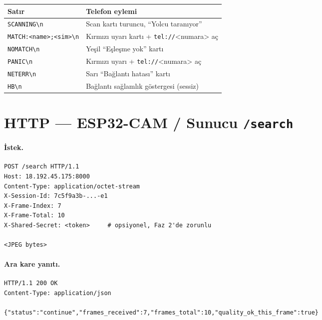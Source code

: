 \begin{tabular}{l l}
\toprule
\textbf{Satır}                                   & \textbf{Telefon eylemi}\\
\midrule
\texttt{SCANNING\textbackslash n}                & Scan kartı turuncu, ``Yolcu taranıyor''\\
\texttt{MATCH:<name>;<sim>\textbackslash n}      & Kırmızı uyarı kartı + \texttt{tel://}<numara> aç\\
\texttt{NOMATCH\textbackslash n}                 & Yeşil ``Eşleşme yok'' kartı\\
\texttt{PANIC\textbackslash n}                   & Kırmızı uyarı + \texttt{tel://}<numara> aç\\
\texttt{NETERR\textbackslash n}                  & Sarı ``Bağlantı hatası'' kartı\\
\texttt{HB\textbackslash n}                      & Bağlantı sağlamlık göstergesi (sessiz)\\
\bottomrule
\end{tabular}

\section{HTTP --- ESP32-CAM / Sunucu \texttt{/search}}

\paragraph{İstek.}

\begin{lstlisting}[language=none, basicstyle=\ttfamily\footnotesize]
POST /search HTTP/1.1
Host: 18.192.45.175:8000
Content-Type: application/octet-stream
X-Session-Id: 7c5f9a3b-...-e1
X-Frame-Index: 7
X-Frame-Total: 10
X-Shared-Secret: <token>     # opsiyonel, Faz 2'de zorunlu

<JPEG bytes>
\end{lstlisting}

\paragraph{Ara kare yanıtı.}

\begin{lstlisting}[language=none, basicstyle=\ttfamily\footnotesize]
HTTP/1.1 200 OK
Content-Type: application/json

{"status":"continue","frames_received":7,"frames_total":10,"quality_ok_this_frame":true}
\end{lstlisting}

